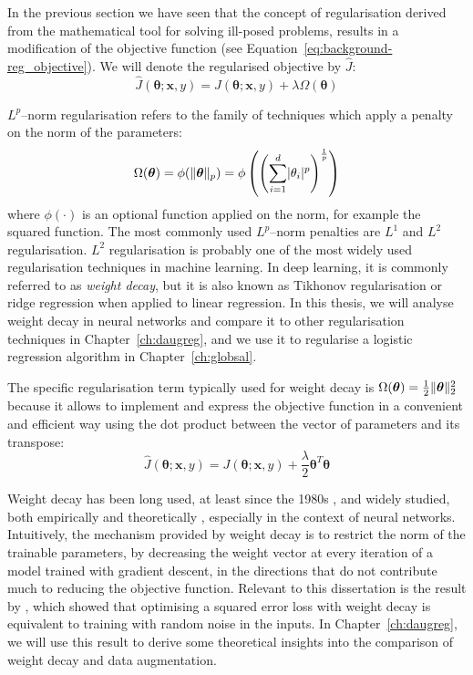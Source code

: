 {In the previous section we have seen that the concept of regularisation derived from the mathematical tool for solving ill-posed problems, results in a modification of the objective function (see Equation~\ref{eq:background-reg_objective}). We will denote the regularised objective by $\hat{J}$:
%
\begin{equation}
\label{eq:background-reg_objective_explicit}
    \hat{J}(\boldsymbol{\theta}; \mathbf{x}, y) = J(\boldsymbol{\theta}; \mathbf{x}, y) + \lambda\Omega(\boldsymbol{\theta})
\end{equation}

$L^p$--norm regularisation refers to the family of techniques which apply a penalty on the norm of the parameters:
%
\begin{equation}
\label{eq:background-l_p_norm}
\Omega(\boldsymbol{\theta}) = \phi(\lVert\boldsymbol{\theta}\rVert_p) = \phi\left(\left(\sum_{i=1}^{d}\lvert\theta_i\rvert^p\right)^{\frac{1}{p}}\right)
\end{equation}
%
where $\phi(\cdot)$ is an optional function applied on the norm, for example the squared function. The most commonly used $L^p$--norm penalties are $L^1$ and $L^2$ regularisation. $L^2$ regularisation is probably one of the most widely used regularisation techniques in machine learning. In deep learning, it is commonly referred to as \textit{weight decay}, but it is also known as Tikhonov regularisation \citep{tikhonov1963regularisation} or ridge regression when applied to linear regression. In this thesis, we will analyse weight decay in neural networks and compare it to other regularisation techniques in Chapter~\ref{ch:daugreg}, and we use it to regularise a logistic regression algorithm in Chapter~\ref{ch:globsal}.

The specific regularisation term typically used for weight decay is $\Omega(\boldsymbol{\theta}) = \frac{1}{2}\lVert\boldsymbol{\theta}\rVert_2^2$ because it allows to implement and express the objective function in a convenient and efficient way using the dot product between the vector of parameters and its transpose:
%
\begin{equation}
\label{eq:background-weight_decay_objective}
    \hat{J}(\boldsymbol{\theta}; \mathbf{x}, y) = J(\boldsymbol{\theta}; \mathbf{x}, y) + \frac{\lambda}{2}\boldsymbol{\theta}^T\boldsymbol{\theta}
\end{equation}

Weight decay has been long used, at least since the 1980s \citep{hinton1987wd}, and widely studied, both empirically \citep{zhang2018wd} and theoretically \citep{krogh1992wd, neyshabur2015regularization}, especially in the context of neural networks. Intuitively, the mechanism provided by weight decay is to restrict the norm of the trainable parameters, by decreasing the weight vector at every iteration of a model trained with gradient descent, in the directions that do not contribute much to reducing the objective function. Relevant to this dissertation is the result by \citet{bishop1995tikhonov}, which showed that optimising a squared error loss with weight decay is equivalent to training with random noise in the inputs. In Chapter~\ref{ch:daugreg}, we will use this result to derive some theoretical insights into the comparison of weight decay and data augmentation.

}
